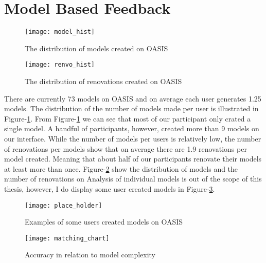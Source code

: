 \section{Model Based Feedback}

\begin{figure}[p]
	\centering
	\texttt{[image: model\_hist]}
	\caption{The distribution of models created on OASIS}
	\label{fig:model_hist}
\end{figure}


\begin{figure}[p]
	\centering
	\texttt{[image: renvo\_hist]}
	\caption{The distribution of renovations created on OASIS}
	\label{fig:renvo_hist}
\end{figure}

There are currently 73 models on OASIS and on average each user generates 1.25 models.
The distribution of the number of models made per user is illustrated in Figure-\ref{fig:model_hist}.
From Figure-\ref{fig:model_hist} we can see that most of our participant only crated a single model.
A handful of participants, however, created more than 9 models on our interface.
While the number of models per users is relatively low, the number of renovations per models show that on average there are 1.9 renovations per model created.
Meaning that about half of our participants renovate their models at least more than once.
Figure-\ref{fig:renvo_hist} show the distribution of models and the number of renovations on %
Analysis of individual models is out of the scope of this thesis, however, I do display some user created models in Figure-\ref{fig:examples}. \\

\begin{figure}[p]
	\centering
	\texttt{[image: place\_holder]}
	\caption{Examples of some users created models on OASIS}
	\label{fig:examples}
\end{figure}

\begin{figure}[p]
	\centering
	\texttt{[image: matching\_chart]}
	\caption{Accuracy in relation to model complexity}
	\label{fig:matching_chart}
\end{figure}

